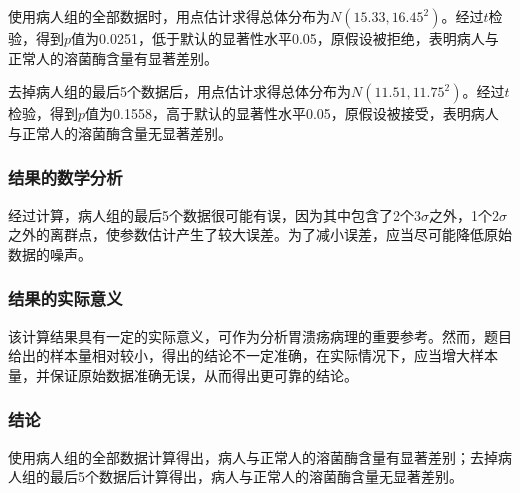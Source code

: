 使用病人组的全部数据时，用点估计求得总体分布为$N(15.33,16.45^2)$。经过$t$检验，得到$p$值为0.0251，低于默认的显著性水平0.05，原假设被拒绝，表明病人与正常人的溶菌酶含量有显著差别。

去掉病人组的最后5个数据后，用点估计求得总体分布为$N(11.51,11.75^2)$。经过$t$检验，得到$p$值为0.1558，高于默认的显著性水平0.05，原假设被接受，表明病人与正常人的溶菌酶含量无显著差别。

\subsubsection{结果的数学分析}

经过计算，病人组的最后5个数据很可能有误，因为其中包含了2个$3\sigma$之外，1个$2\sigma$之外的离群点，使参数估计产生了较大误差。为了减小误差，应当尽可能降低原始数据的噪声。

\subsubsection{结果的实际意义}

该计算结果具有一定的实际意义，可作为分析胃溃疡病理的重要参考。然而，题目给出的样本量相对较小，得出的结论不一定准确，在实际情况下，应当增大样本量，并保证原始数据准确无误，从而得出更可靠的结论。

\subsubsection{结论}

使用病人组的全部数据计算得出，病人与正常人的溶菌酶含量有显著差别；去掉病人组的最后5个数据后计算得出，病人与正常人的溶菌酶含量无显著差别。
